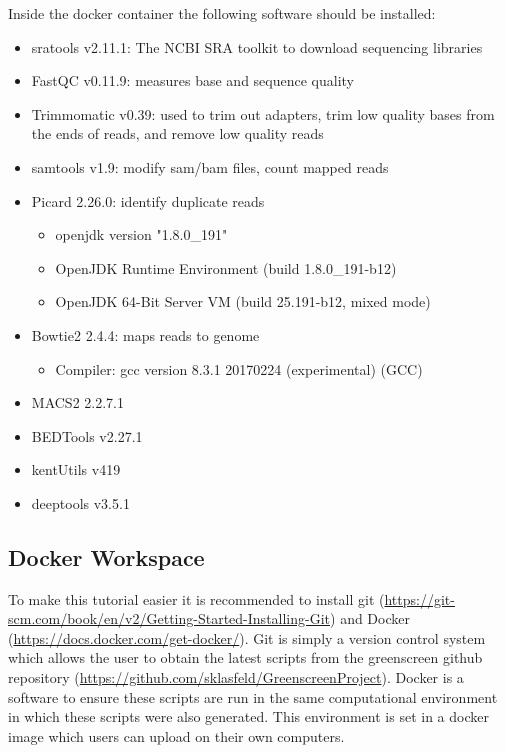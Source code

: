 \documentclass{article}
\begin{document}
\begin{sloppypar}
Inside the docker container the following software should be installed:
\begin{itemize}
    \item sratools v2.11.1: The NCBI SRA toolkit to download sequencing libraries
    \item FastQC v0.11.9: measures base and sequence quality \cite{FastQC}
    \item Trimmomatic v0.39: used to trim out adapters, trim low quality bases from the ends of reads, and remove low quality
    reads \cite{Trimmomatic}
    \item samtools v1.9: modify sam/bam files, count mapped reads \cite{SAMtools}
    \item Picard 2.26.0: identify duplicate reads \cite{Picard}
    \begin{itemize}
        \item openjdk version "1.8.0\_191"
        \item OpenJDK Runtime Environment (build 1.8.0\_191-b12)
        \item OpenJDK 64-Bit Server VM (build 25.191-b12, mixed mode)
    \end{itemize}
    \item Bowtie2 2.4.4: maps reads to genome \cite{bowtie2}
    \begin{itemize}
        \item Compiler: gcc version 8.3.1 20170224 (experimental) (GCC)
    \end{itemize}
    \item MACS2 2.2.7.1 \cite{macs}
    \item BEDTools v2.27.1 \cite{bedtools}
    \item kentUtils v419 \cite{kentUtils}
    \item deeptools v3.5.1 \cite{deeptools}
\end{itemize}

\subsection{Docker Workspace}
To make this tutorial easier it is recommended to install git \cite{git} (\url{https://git-scm.com/book/en/v2/Getting-Started-Installing-Git}) and Docker \cite{Docker} (\url{https://docs.docker.com/get-docker/}). Git is simply a version control system which allows the user to obtain the latest scripts from the greenscreen github repository (\url{https://github.com/sklasfeld/GreenscreenProject}). Docker is a software to ensure these scripts are run in the same computational environment in which these scripts were also generated. This environment is set in a docker image which users can upload on their own computers.


\end{sloppypar}
\end{document}
